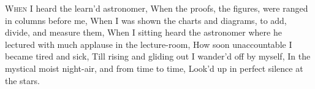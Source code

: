 \documentclass[fontsize=9, a5paper]{scrbook}
\newcommand\blankpage{%
    \null
    \thispagestyle{empty}%
    \addtocounter{page}{-1}%
    \newpage}
\begin{document}
\pagebreak

\afterpage{\blankpage}
\begin{poem}
	\begin{stanza}
		\textsc{When I} heard the learn’d astronomer,\verseline
		When the proofs, \verseline
			\verseindent the figures, \verseline
				\verseindent\verseindent were ranged in columns before me,\verseline
		When I was shown the charts and diagrams, \verseline
			\verseindent to add, divide,\verseline
				\verseindent\verseindent and measure them,\verseline
		When I sitting heard the astronomer \verseline
			\verseindent where he lectured \verseline
				\verseindent\verseindent with much applause in the lecture-room,\verseline
		How soon unaccountable I became \verseline
			\verseindent tired and sick,\verseline
		Till rising and gliding out \verseline
			\verseindent I wander’d off by myself,\verseline
		In the mystical moist night-air, \verseline
			\verseindent and from time to time,\verseline
		Look’d up in perfect silence at the stars.
	\end{stanza}
\end{poem}

\pagebreak
\end{document}
